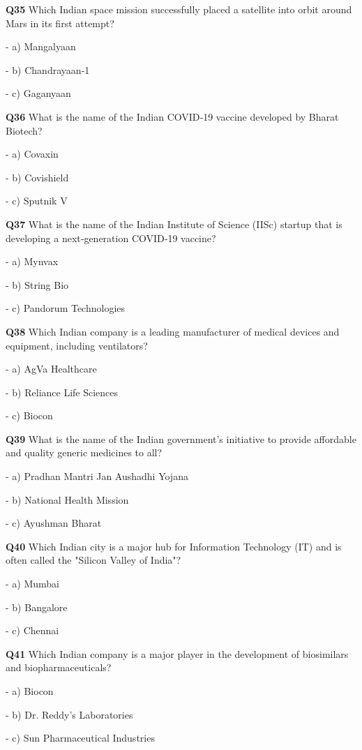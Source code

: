 \textbf{Q35} Which Indian space mission successfully placed a satellite into orbit around Mars in its first attempt?\par
\quad - a) Mangalyaan\par
\quad - b) Chandrayaan‑1\par
\quad - c) Gaganyaan\par

\textbf{Q36} What is the name of the Indian COVID‑19 vaccine developed by Bharat Biotech?\par
\quad - a) Covaxin\par
\quad - b) Covishield\par
\quad - c) Sputnik V\par

\textbf{Q37} What is the name of the Indian Institute of Science (IISc) startup that is developing a next‑generation COVID‑19 vaccine?\par
\quad - a) Mynvax\par
\quad - b) String Bio\par
\quad - c) Pandorum Technologies\par

\textbf{Q38} Which Indian company is a leading manufacturer of medical devices and equipment, including ventilators?\par
\quad - a) AgVa Healthcare\par
\quad - b) Reliance Life Sciences\par
\quad - c) Biocon\par

\textbf{Q39} What is the name of the Indian government's initiative to provide affordable and quality generic medicines to all?\par
\quad - a) Pradhan Mantri Jan Aushadhi Yojana\par
\quad - b) National Health Mission\par
\quad - c) Ayushman Bharat\par

\textbf{Q40} Which Indian city is a major hub for Information Technology (IT) and is often called the "Silicon Valley of India"?\par
\quad - a) Mumbai\par
\quad - b) Bangalore\par
\quad - c) Chennai\par

\textbf{Q41} Which Indian company is a major player in the development of biosimilars and biopharmaceuticals?\par
\quad - a) Biocon\par
\quad - b) Dr. Reddy's Laboratories\par
\quad - c) Sun Pharmaceutical Industries\par

